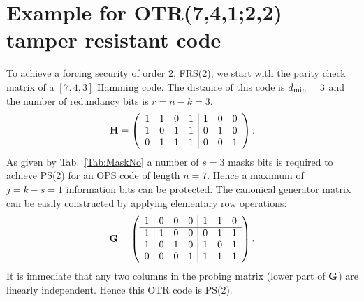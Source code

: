 \documentclass[11pt]{llncs}
\newcommand{\BE}{\begin{equation}}      \newcommand{\EE}{\end{equation}}
\begin{document}
\section{Example for OTR(7,4,1;2,2) tamper resistant code}\label{App:OTR_Example1}
To achieve a forcing security of order 2, FRS(2),
we start with the parity check matrix of a $[7,4,3]$ Hamming code.
The distance of this code is $d_\text{min} = 3$ and the number of redundancy
bits is $r = n - k = 3$.
\BE
\V H =
  \left(\begin{array}{cccc|ccc}
    1 & 1 & 0 & 1 & 1 & 0 & 0 \\
    1 & 0 & 1 & 1 & 0 & 1 & 0 \\
    0 & 1 & 1 & 1 & 0 & 0 & 1
  \end{array}\right).
\EE
As given by Tab.~\ref{Tab:MaskNo} a number of $s = 3$
masks bits is required to achieve PS(2) for an OPS code of length $n = 7$.
Hence a maximum of $j = k-s = 1$
information bits can be protected.
The canonical generator matrix can be easily constructed
by applying elementary row operations:
\BE
\V G =
  \left(\begin{array}{c|ccc|ccc}
    1 & 0 & 0 & 0 & 1 & 1 & 0 \\
    \hline
    1 & 1 & 0 & 0 & 0 & 1 & 1 \\
    1 & 0 & 1 & 0 & 1 & 0 & 1 \\
    0 & 0 & 0 & 1 & 1 & 1 & 1
  \end{array}\right).
\EE
It is immediate that any two columns in the probing matrix
(lower part of $\mathbf{G}$) are linearly independent.
Hence this OTR code is PS(2).
\end{document}
